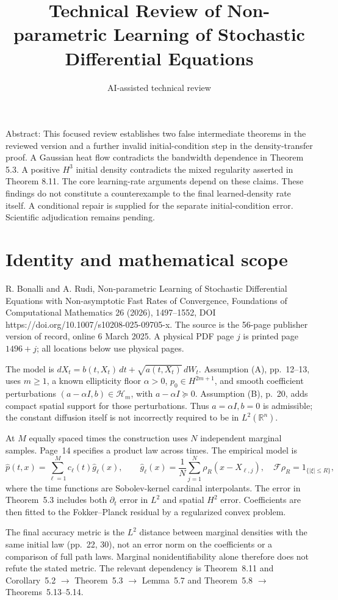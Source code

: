 \documentclass[10pt]{article}
\title{Technical Review of Non-parametric
Learning of Stochastic Differential Equations}
\author{AI-assisted technical review}
\date{}
\begin{document}
\maketitle
Abstract: This focused review establishes two false intermediate theorems in the reviewed version and a further invalid initial-condition step in the density-transfer proof. A Gaussian heat flow contradicts the bandwidth dependence in Theorem 5.3. A positive \(H^3\) initial density contradicts the mixed regularity asserted in Theorem 8.11. The core learning-rate arguments depend on these claims. These findings do not constitute a counterexample to the final learned-density rate itself. A conditional repair is supplied for the separate initial-condition error. Scientific adjudication remains pending.\par
\section*{Identity and mathematical scope}
R. Bonalli and A. Rudi, Non-parametric Learning of Stochastic Differential Equations with Non-asymptotic Fast Rates of Convergence, Foundations of Computational Mathematics 26 (2026), 1497–1552, DOI https://doi.org/10.1007/s10208-025-09705-x. The source is the 56-page publisher version of record, online 6 March 2025. A physical PDF page \(j\) is printed page \(1496+j\); all locations below use physical pages.\par
The model is \(dX_t=b(t,X_t)\,dt+\sqrt{a(t,X_t)}\,dW_t\). Assumption (A), pp. 12–13, uses \(m\ge1\), a known ellipticity floor \(\alpha>0\), \(p_0\in H^{2m+1}\), and smooth coefficient perturbations \((a-\alpha I,b)\in\mathcal H_m\), with \(a-\alpha I\succeq0\). Assumption (B), p. 20, adds compact spatial support for those perturbations. Thus \(a=\alpha I,b=0\) is admissible; the constant diffusion itself is not incorrectly required to be in \(L^2(\mathbb R^n)\).\par
At \(M\) equally spaced times the construction uses \(N\) independent marginal samples. Page 14 specifies a product law across times. The empirical model is \[\widehat p(t,x)=\sum_{\ell=1}^M c_\ell(t)\widehat g_\ell(x),
 \qquad
 \widehat g_\ell(x)=\frac1N\sum_{j=1}^N\rho_R(x-X_{\ell,j}),
 \quad \mathcal F\rho_R=1_{\{|\xi|\le R\}},\] where the time functions are Sobolev-kernel cardinal interpolants. The error in Theorem 5.3 includes both \(\partial_t\) error in \(L^2\) and spatial \(H^2\) error. Coefficients are then fitted to the Fokker–Planck residual by a regularized convex problem.\par
The final accuracy metric is the \(L^2\) distance between marginal densities with the same initial law (pp. 22, 30), not an error norm on the coefficients or a comparison of full path laws. Marginal nonidentifiability alone therefore does not refute the stated metric. The relevant dependency is Theorem 8.11 and Corollary 5.2 \(\longrightarrow\) Theorem 5.3 \(\longrightarrow\) Lemma 5.7 and Theorem 5.8 \(\longrightarrow\) Theorems 5.13–5.14.\par
\end{document}
